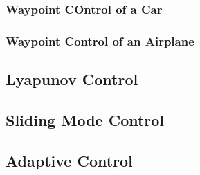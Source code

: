 \subsubsection{Waypoint COntrol of a Car}

\subsubsection{Waypoint Control of an Airplane}

\subsection{Lyapunov Control}

\subsection{Sliding Mode Control}

\subsection{Adaptive Control}

